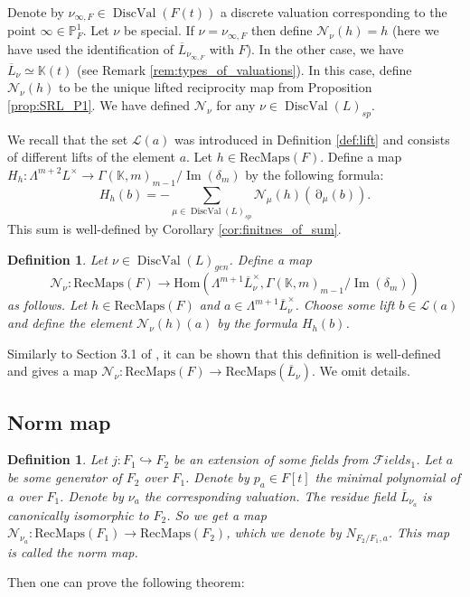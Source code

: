 \documentclass[12pt]{extarticle}
\newtheorem{definition}[theorem]{Definition}
\def\mb{\mathbb}
\def\mc{\mathcal}
\def\k{\mb K}
\def\N{\mc N}
\def\oL{\ol L}
\def\t{\times}
\def\emb{\hookrightarrow}
\def\ol{\overline}
\renewcommand{\P}{{\mb P}}
\def\F{{\mc Fields}}
\newcommand{\SRL}{\mathrm{RecMaps}}
\newcommand{\Hom}{\mathrm{Hom}}
\DeclareMathOperator{\ts}{\partial}
\DeclareMathOperator{\im}{Im}
\DeclareMathOperator{\dval}{DiscVal}
\begin{document}
Denote by $\nu_{\infty, F}\in\dval(F(t))$ a discrete valuation corresponding to the point $\infty\in\P^1_F$. Let $\nu$ be special. If $\nu=\nu_{\infty,F}$ then define $\N_\nu(h)=h$ (here we have used the identification of $\oL_{\nu_{\infty,F}}$ with $F$). In the other case, we have $\overline{L}_\nu\simeq \k(t)$ (see Remark \ref{rem:types_of_valuations}). In this case, define $\N_\nu(h)$ to be the unique lifted reciprocity map from Proposition \ref{prop:SRL_P1}. We have defined $\N_\nu$ for any $\nu\in \dval(L)_{sp}$. 

We recall that the set $\mc L(a)$ was introduced in Definition \ref{def:lift} and consists of different lifts of the element $a$. Let $h\in\SRL(F)$. Define a map $H_h\colon \Lambda^{m+2} L^\t\to \Gamma(\k,m)_{m-1}/\im(\delta_m)$ by the following formula:
$$H_h(b)=-\sum\limits_{\mu\in \dval(L)_{sp}}\N_\mu(h)(\ts_{\mu}(b)).$$ 
This sum is well-defined by Corollary \ref{cor:finitnes_of_sum}. 
\begin{definition}
\label{def:theta_gen}
Let $\nu\in\dval(L)_{gen}$. Define a map $$\N_\nu\colon \SRL(F)\to \Hom(\Lambda^{m+1}\ol L_\nu^\t,  \Gamma(\k,m)_{m-1}/\im(\delta_m))$$ as follows. Let $h\in\SRL(F)$ and $a\in \Lambda^{m+1}\ol L_\nu^\t$. Choose some lift $b\in\mc L(a)$ and define the element $\N_\nu(h)(a)$ by the formula $H_h(b)$. 
\end{definition}

Similarly to Section 3.1 of \cite{bolbachan_2023_chow}, it can be shown that this definition is well-defined and gives a map $\N_\nu\colon \SRL(F)\to \SRL(\ol L_\nu).$ We omit details.

\subsection{Norm map}

\begin{definition}
\label{def:norm_map}
Let $j\colon F_1\emb F_2$ be an extension of some fields from $\F_1$. Let $a$ be some generator of $F_2$ over $F_1$. Denote by $p_a\in F[t]$ the minimal polynomial of $a$ over $F_1$. Denote by $\nu_a$ the corresponding valuation. The residue field $\overline{L}_{\nu_{a}}$ is canonically isomorphic to $F_2$. So we get a map $\N_{{\nu_a}}\colon\SRL(F_1)\to \SRL(F_2)$, which we denote by $N_{F_2/F_1, a}$. This map is called \emph{the norm map}. 
\end{definition}

Then one can prove the following theorem:
\end{document}

